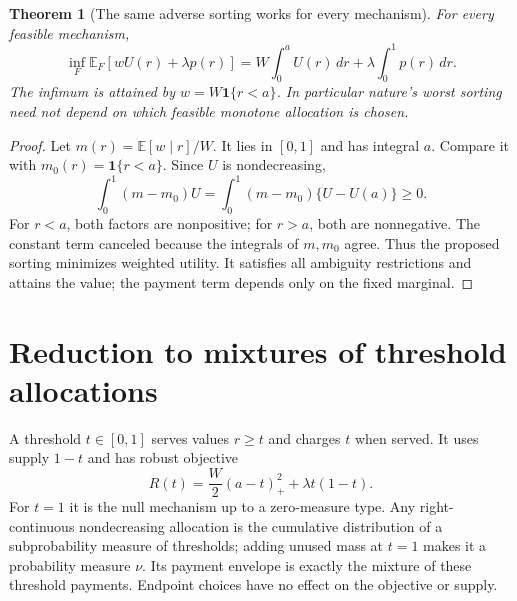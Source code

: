 \documentclass[11pt]{article}
\newtheorem{theorem}{Theorem}
\theoremstyle{remark}\newtheorem{remark}[theorem]{Remark}
\newcommand{\E}{\mathbb E}
\newcommand{\ind}{\mathbf 1}
\begin{document}
\begin{theorem}[The same adverse sorting works for every mechanism]
For every feasible mechanism,
\[
 \inf_F\E_F[wU(r)+\lambda p(r)]
 =W\int_0^a U(r)\,dr+\lambda\int_0^1p(r)\,dr.
\]
The infimum is attained by $w=W\ind\{r<a\}$. In particular nature's worst sorting need not depend on which feasible monotone allocation is chosen.
\end{theorem}
\begin{proof}
Let $m(r)=\E[w\mid r]/W$. It lies in $[0,1]$ and has integral $a$. Compare it with $m_0(r)=\ind\{r<a\}$. Since $U$ is nondecreasing,
\[
 \int_0^1(m-m_0)U
 =\int_0^1(m-m_0)\{U-U(a)\}\ge0.
\]
For $r<a$, both factors are nonpositive; for $r>a$, both are nonnegative. The constant term canceled because the integrals of $m,m_0$ agree. Thus the proposed sorting minimizes weighted utility. It satisfies all ambiguity restrictions and attains the value; the payment term depends only on the fixed marginal.
\end{proof}

\section*{Reduction to mixtures of threshold allocations}
A threshold $t\in[0,1]$ serves values $r\ge t$ and charges $t$ when served. It uses supply $1-t$ and has robust objective
\[
 R(t)=\frac W2(a-t)_+^2+\lambda t(1-t).
\]
For $t=1$ it is the null mechanism up to a zero-measure type. Any right-continuous nondecreasing allocation is the cumulative distribution of a subprobability measure of thresholds; adding unused mass at $t=1$ makes it a probability measure $\nu$. Its payment envelope is exactly the mixture of these threshold payments. Endpoint choices have no effect on the objective or supply.
\end{document}

